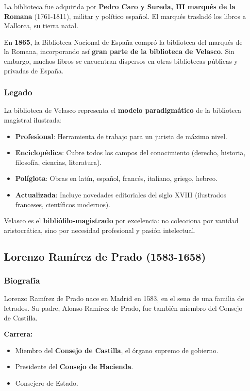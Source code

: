 \documentclass[11pt,a4paper]{article}
\begin{document}
La biblioteca fue adquirida por \textbf{Pedro Caro y Sureda, III marqués de la Romana} (1761-1811), militar y político español. El marqués trasladó los libros a Mallorca, su tierra natal.

En \textbf{1865}, la Biblioteca Nacional de España compró la biblioteca del marqués de la Romana, incorporando así \textbf{gran parte de la biblioteca de Velasco}. Sin embargo, muchos libros se encuentran dispersos en otras bibliotecas públicas y privadas de España.

\subsubsection{Legado}

La biblioteca de Velasco representa el \textbf{modelo paradigmático} de la biblioteca magistral ilustrada:

\begin{itemize}
\item \textbf{Profesional}: Herramienta de trabajo para un jurista de máximo nivel.
\item \textbf{Enciclopédica}: Cubre todos los campos del conocimiento (derecho, historia, filosofía, ciencias, literatura).
\item \textbf{Políglota}: Obras en latín, español, francés, italiano, griego, hebreo.
\item \textbf{Actualizada}: Incluye novedades editoriales del siglo XVIII (ilustrados franceses, científicos modernos).
\end{itemize}

Velasco es el \textbf{bibliófilo-magistrado} por excelencia: no colecciona por vanidad aristocrática, sino por necesidad profesional y pasión intelectual.

\subsection{Lorenzo Ramírez de Prado (1583-1658)}

\subsubsection{Biografía}

Lorenzo Ramírez de Prado nace en Madrid en 1583, en el seno de una familia de letrados. Su padre, Alonso Ramírez de Prado, fue también miembro del Consejo de Castilla.

\textbf{Carrera:}
\begin{itemize}
\item Miembro del \textbf{Consejo de Castilla}, el órgano supremo de gobierno.
\item Presidente del \textbf{Consejo de Hacienda}.
\item Consejero de Estado.
\end{itemize}
\end{document}
